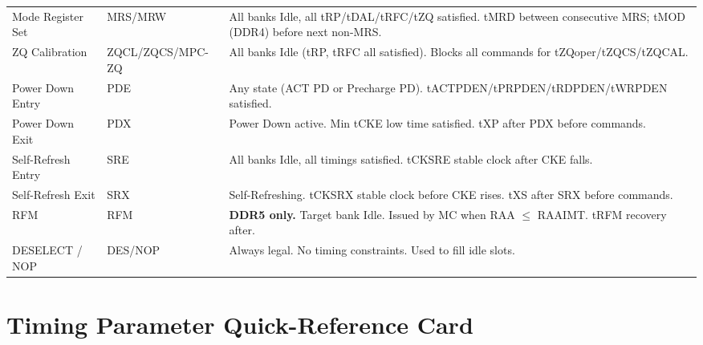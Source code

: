 \documentclass[11pt,a4paper]{article}
\begin{document}
\begin{longtable}{L{2.8cm} L{1.8cm} L{9cm}}
Mode Register Set & MRS/MRW & All banks Idle, all tRP/tDAL/tRFC/tZQ satisfied. tMRD between consecutive MRS; tMOD (DDR4) before next non-MRS. \\
ZQ Calibration    & ZQCL/ZQCS/MPC-ZQ & All banks Idle (tRP, tRFC all satisfied). Blocks all commands for tZQoper/tZQCS/tZQCAL. \\

Power Down Entry  & PDE   & Any state (ACT PD or Precharge PD). tACTPDEN/tPRPDEN/tRDPDEN/tWRPDEN satisfied. \\
Power Down Exit   & PDX   & Power Down active. Min tCKE low time satisfied. tXP after PDX before commands. \\

Self-Refresh Entry & SRE  & All banks Idle, all timings satisfied. tCKSRE stable clock after CKE falls. \\
Self-Refresh Exit  & SRX  & Self-Refreshing. tCKSRX stable clock before CKE rises. tXS after SRX before commands. \\

RFM               & RFM   & \textbf{DDR5 only.} Target bank Idle. Issued by MC when RAA $\leq$ RAAIMT. tRFM recovery after. \\
DESELECT / NOP    & DES/NOP & Always legal. No timing constraints. Used to fill idle slots. \\
\end{longtable}

\section{Timing Parameter Quick-Reference Card}
\end{document}
